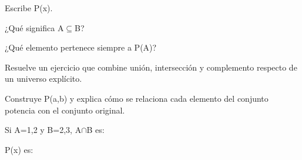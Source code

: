 \begin{activity}[id=dia-29-corta-04,type=short,weight=1]

Escribe P({x}).

\end{activity}

\begin{activity}[id=dia-29-corta-05,type=short,weight=1]

¿Qué significa A\(\subseteq\)B?

\end{activity}

\begin{activity}[id=dia-29-corta-06,type=short,weight=1]

¿Qué elemento pertenece siempre a P(A)?

\end{activity}

\begin{activity}[id=dia-29-desarrollo-01,type=long,weight=2]

Resuelve un ejercicio que combine unión, intersección y complemento respecto de un universo explícito.

\end{activity}

\begin{activity}[id=dia-29-desarrollo-02,type=long,weight=2]

Construye P({a,b}) y explica cómo se relaciona cada elemento del conjunto potencia con el conjunto original.

\end{activity}

\begin{activity}[id=dia-29-opcion-01,type=choice,weight=1]

Si A={1,2} y B={2,3}, A\(\cap\)B es:





\end{activity}

\begin{activity}[id=dia-29-opcion-02,type=choice,weight=1]

P({x}) es:





\end{activity}

